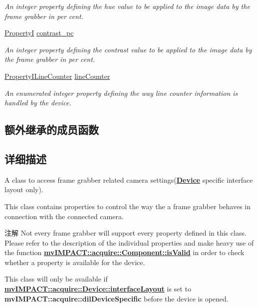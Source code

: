 \begin{DoxyCompactItemize}
\begin{DoxyCompactList}\small\item\em An integer property defining the hue value to be applied to the image data by the frame grabber in per cent. \end{DoxyCompactList}\item 
\hyperlink{group___common_interface_ga12d5e434238ca242a1ba4c6c3ea45780}{Property\+I} \hyperlink{classmv_i_m_p_a_c_t_1_1acquire_1_1_camera_settings_frame_grabber_ab7ab2179bcc174da9b31af1293842e49}{contrast\+\_\+pc}
\begin{DoxyCompactList}\small\item\em An integer property defining the contrast value to be applied to the image data by the frame grabber in per cent. \end{DoxyCompactList}\item 
\hyperlink{group___device_specific_interface_ga104cc83eecc5f80f03154860ac2068ff}{Property\+I\+Line\+Counter} \hyperlink{classmv_i_m_p_a_c_t_1_1acquire_1_1_camera_settings_frame_grabber_a91835afe55d029af84a48915ad5081da}{line\+Counter}
\begin{DoxyCompactList}\small\item\em An enumerated integer property defining the way line counter information is handled by the device. \end{DoxyCompactList}\end{DoxyCompactItemize}
\subsection*{额外继承的成员函数}


\subsection{详细描述}
A class to access frame grabber related camera settings({\bfseries \hyperlink{classmv_i_m_p_a_c_t_1_1acquire_1_1_device}{Device}} specific interface layout only). 

This class contains properties to control the way the a frame grabber behaves in connection with the connected camera.

\begin{DoxyNote}{注解}
Not every frame grabber will support every property defined in this class. Please refer to the description of the individual properties and make heavy use of the function {\bfseries \hyperlink{classmv_i_m_p_a_c_t_1_1acquire_1_1_component_ac51e55e7e046101f3c6119d84123abd5}{mv\+I\+M\+P\+A\+C\+T\+::acquire\+::\+Component\+::is\+Valid}} in order to check whether a property is available for the device.

This class will only be available if {\bfseries \hyperlink{classmv_i_m_p_a_c_t_1_1acquire_1_1_device_ab4dd0ecc9d456bb5ddc01d844c9d6f2d}{mv\+I\+M\+P\+A\+C\+T\+::acquire\+::\+Device\+::interface\+Layout}} is set to {\bfseries mv\+I\+M\+P\+A\+C\+T\+::acquire\+::dil\+Device\+Specific} before the device is opened. 
\end{DoxyNote}


